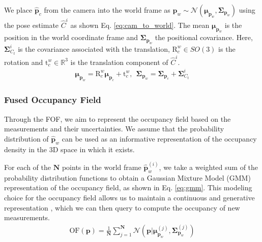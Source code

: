 We place $\widehat{\mathbf{p}}_c$ from the camera into the world frame as $\widehat{\mathbf{p}}_w \sim \mathcal{N}(\boldsymbol{\mu}_{\mathbf{p}_w}, \mathbf{\Sigma}_{\mathbf{p}_w})$ using the pose estimate $\widehat{C}^i$ as shown Eq. \eqref{eq:cam_to_world}. 
The mean $\boldsymbol{\mu}_{\mathbf{p}_w}$ is the position in the world coordinate frame and $\mathbf{\Sigma}_{\mathbf{p}_w}$ the positional covariance.
Here, $\mathbf{\Sigma}_{C_t}^i$ is the covariance associated with the translation, $\text{R}_c^w \in SO(3)$ is the rotation and $\text{t}_c^w \in \mathbb{R}^3$ is the translation component of $\widehat{C}^i$.
\begin{gather}
    \boldsymbol{\mu}_{\mathbf{p}_w} = \text{R}_c^w \boldsymbol{\mu}_{\mathbf{p}_c} + \text{t}_c^w,\ \ \mathbf{\Sigma}_{\mathbf{p}_w} = \mathbf{\Sigma}_{\mathbf{p}_c} + \mathbf{\Sigma}_{C_t}^i \label{eq:cam_to_world}
\end{gather}

\subsubsection{Fused Occupancy Field} \label{sss:FOFc}
Through the FOF, we aim to represent the occupancy field based on the measurements and their uncertainties.
We assume that the probability distribution of $\widehat{\mathbf{p}}_w$ can be used as an informative representation of the occupancy density in the 3D space in which it exists.

For each of the $\mathbf{N}$ points in the world frame $\widehat{\mathbf{p}}_w^{(i)}$, we take a weighted sum of the probability distribution functions to obtain a Gaussian Mixture Model (GMM) representation of the occupancy field, as shown in Eq. \eqref{eq:gmm}.
This modeling choice for the occupancy field allows us to maintain a continuous and generative representation \cite{gmm_perception}, which we can then query to compute the occupancy of new measurements.
\begin{gather}
    \text{OF}(\mathbf{p}) = \frac{1}{\mathbf{N}}\sum_{j=1}^{\mathbf{N}} \mathcal{N}(\mathbf{p} \lvert \boldsymbol{\mu}_{\mathbf{p}_w}^{(j)}, \mathbf{\Sigma}_{\mathbf{p}_w}^{(j)}) \label{eq:gmm}
\end{gather}

